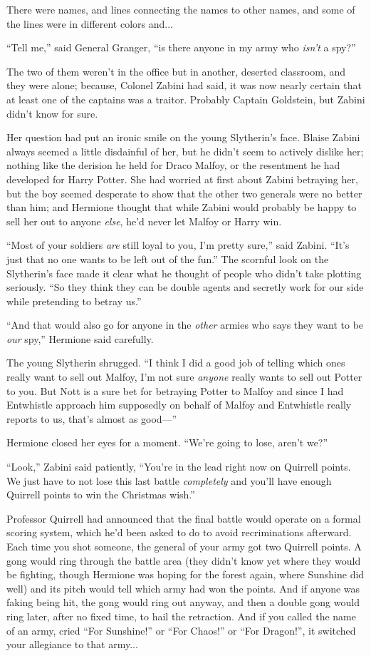 There were names, and lines connecting the names to other names, and some of the lines were in different colors and...

“Tell me,” said General Granger, “is there anyone in my army who \emph{isn’t} a spy?”

The two of them weren’t in the office but in another, deserted classroom, and they were alone; because, Colonel Zabini had said, it was now nearly certain that at least one of the captains was a traitor. Probably Captain Goldstein, but Zabini didn’t know for sure.

Her question had put an ironic smile on the young Slytherin’s face. Blaise Zabini always seemed a little disdainful of her, but he didn’t seem to actively dislike her; nothing like the derision he held for Draco Malfoy, or the resentment he had developed for Harry Potter. She had worried at first about Zabini betraying her, but the boy seemed desperate to show that the other two generals were no better than him; and Hermione thought that while Zabini would probably be happy to sell her out to anyone \emph{else}, he’d never let Malfoy or Harry win.

“Most of your soldiers \emph{are} still loyal to you, I’m pretty sure,” said Zabini. “It’s just that no one wants to be left out of the fun.” The scornful look on the Slytherin’s face made it clear what he thought of people who didn’t take plotting seriously. “So they think they can be double agents and secretly work for our side while pretending to betray us.”

“And that would also go for anyone in the \emph{other} armies who says they want to be \emph{our} spy,” Hermione said carefully.

The young Slytherin shrugged. “I think I did a good job of telling which ones really want to sell out Malfoy, I’m not sure \emph{anyone} really wants to sell out Potter to you. But Nott is a sure bet for betraying Potter to Malfoy and since I had Entwhistle approach him supposedly on behalf of Malfoy and Entwhistle really reports to us, that’s almost as good—”

Hermione closed her eyes for a moment. “We’re going to lose, aren’t we?”

“Look,” Zabini said patiently, “You’re in the lead right now on Quirrell points. We just have to not lose this last battle \emph{completely} and you’ll have enough Quirrell points to win the Christmas wish.”

Professor Quirrell had announced that the final battle would operate on a formal scoring system, which he’d been asked to do to avoid recriminations afterward. Each time you shot someone, the general of your army got two Quirrell points. A gong would ring through the battle area (they didn’t know yet where they would be fighting, though Hermione was hoping for the forest again, where Sunshine did well) and its pitch would tell which army had won the points. And if anyone was faking being hit, the gong would ring out anyway, and then a double gong would ring later, after no fixed time, to hail the retraction. And if you called the name of an army, cried “For Sunshine!” or “For Chaos!” or “For Dragon!”, it switched your allegiance to that army...

